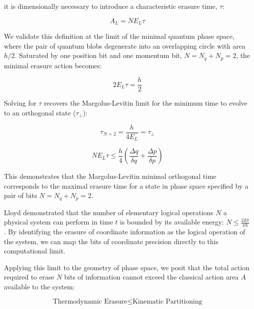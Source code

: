 \documentclass[%
  aps, reprint, prl, amsmath,amssymb
]{revtex4-2}
\begin{document}
it is dimensionally necessary to introduce a characteristic erasure time, $\tau$:

\begin{equation}
\label{eq:ErasureActionDefinition}
A_L = N E_L \tau
\end{equation}

We validate this definition at the limit of the minimal quantum phase space, where the pair of quantum blobs degenerate into an overlapping circle with area $h/2$. Saturated by one position bit and one momentum bit, $N = N_q + N_p = 2$, the minimal erasure action becomes:

\begin{equation}
\label{eq:MinimalErasureAction}
2 E_L \tau = \frac{h}{2}
\end{equation}

Solving for $\tau$ recovers the Margolus-Levitin limit \cite{MargolusLevitin1998} for the minimum time to evolve to an orthogonal state ($\tau_\perp$):

\begin{equation}
\label{eq:MLErasureTime}
\tau_{N=2} = \frac{h}{4 E_L} = \tau_\perp
\end{equation}

\begin{equation}
\label{eq:SpeedLimitHero}
N E_L \tau \le \frac{h}{4} \left( \frac{\Delta q}{\delta q} + \frac{\Delta p}{\delta p} \right)
\end{equation}

This demonstrates that the Margolus-Levitin minimal orthogonal time corresponds to the maximal erasure time for a state in phase space specified by a pair of bits $N=N_q+N_p=2$.

Lloyd demonstrated that the number of elementary logical operations $N$ a physical system can perform in time $t$ is bounded by its available energy: $N \le \frac{2 E t}{\pi \hbar}$ \cite{Lloyd2000}. By identifying the erasure of coordinate information as the logical operation of the system, we can map the bits of coordinate precision directly to this computational limit.

Applying this limit to the geometry of phase space, we posit that the total action required to erase $N$ bits of information cannot exceed the classical action area $A$ available to the system:

\begin{equation}
\label{eq:ErasureAndClassicalActionPlain}
\text{Thermodynamic Erasure} \le \text{Kinematic Partitioning}
\end{equation}
\end{document}
